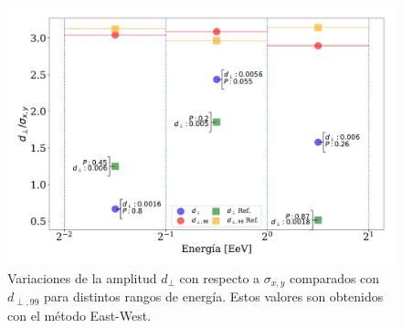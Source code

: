 \documentclass[11pt, letterpaper,oneside]{article}
\begin{document}
\begin{figure}[H]
    \begin{small}
        \begin{center}
            
            \includegraphics[width=\textwidth]{Figs/d_perp_normalizado_sigmas_v6.pdf}
            \vspace*{-1 cm}
        \end{center}
        \caption{Variaciones de la amplitud $d_\perp$ con respecto a $\sigma_{x,y}$ comparados con $d_{\perp,99}$ para distintos rangos de energía. Estos valores son obtenidos con el método East-West. }
        \label{fig:normalizado_sigma}
    \end{small}
\end{figure}
\end{document}
